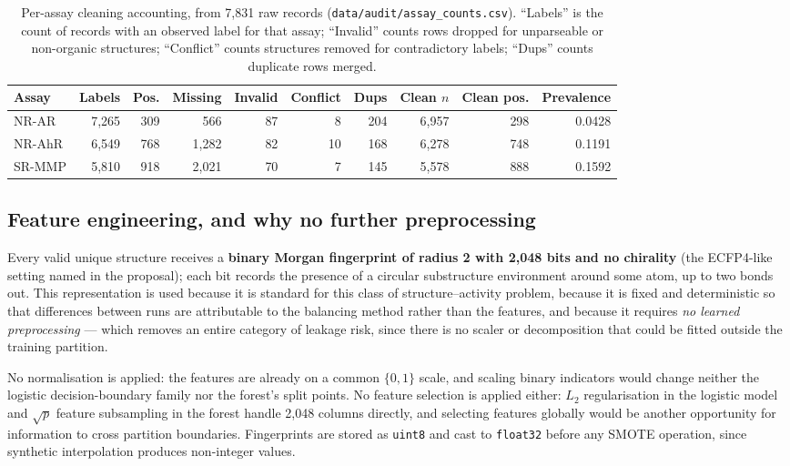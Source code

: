 \documentclass[10pt,letterpaper]{article}
\begin{document}
\begin{table}[!htbp]
\centering
\footnotesize
\caption{Per-assay cleaning accounting, from 7{,}831 raw records
(\texttt{data/audit/assay\_counts.csv}). ``Labels'' is the count of records with an observed label
for that assay; ``Invalid'' counts rows dropped for unparseable or non-organic structures;
``Conflict'' counts structures removed for contradictory labels; ``Dups'' counts duplicate rows
merged.}
\label{tab:counts}
\begin{tabular}{@{}lrrrrrrrrr@{}}
\toprule
Assay & Labels & Pos. & Missing & Invalid & Conflict & Dups & Clean $n$ & Clean pos. & Prevalence \\
\midrule
NR-AR  & 7{,}265 & 309 & 566 & 87 & 8 & 204 & 6{,}957 & 298 & 0.0428 \\
NR-AhR & 6{,}549 & 768 & 1{,}282 & 82 & 10 & 168 & 6{,}278 & 748 & 0.1191 \\
SR-MMP & 5{,}810 & 918 & 2{,}021 & 70 & 7 & 145 & 5{,}578 & 888 & 0.1592 \\
\bottomrule
\end{tabular}
\end{table}

\subsection{Feature engineering, and why no further preprocessing}
\label{sec:features}

Every valid unique structure receives a \textbf{binary Morgan fingerprint of radius 2 with 2{,}048
bits and no chirality} (the ECFP4-like setting named in the proposal); each bit records the presence
of a circular substructure environment around some atom, up to two bonds out. This representation is
used because it is standard for this class of structure--activity problem, because it is fixed and
deterministic so that differences between runs are attributable to the balancing method rather than
the features, and because it requires \emph{no learned preprocessing} --- which removes an entire
category of leakage risk, since there is no scaler or decomposition that could be fitted outside the
training partition.

No normalisation is applied: the features are already on a common $\{0,1\}$ scale, and scaling binary
indicators would change neither the logistic decision-boundary family nor the forest's split points.
No feature selection is applied either: $L_2$ regularisation in the logistic model and $\sqrt{p}$
feature subsampling in the forest handle 2{,}048 columns directly, and selecting features globally
would be another opportunity for information to cross partition boundaries. Fingerprints are stored
as \texttt{uint8} and cast to \texttt{float32} before any SMOTE operation, since synthetic
interpolation produces non-integer values.
\end{document}
